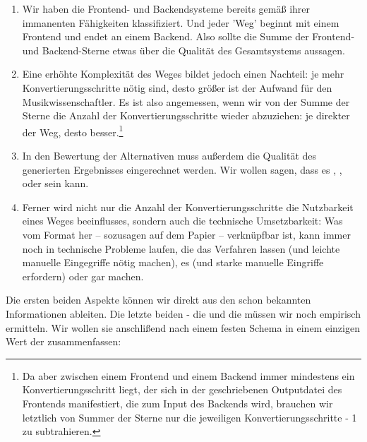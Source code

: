 \begin{enumerate}
  \item Wir haben die Frontend- und Backendsysteme bereits gemäß ihrer immanenten
  Fähigkeiten klassifiziert. Und jeder 'Weg' beginnt mit einem Frontend und endet
  an einem Backend. Also sollte die Summe der Frontend- und Backend-Sterne etwas
  über die Qualität des Gesamtsystems aussagen.
  \item Eine erhöhte Komplexität des Weges bildet jedoch einen Nachteil: je mehr
  Konvertierungsschritte nötig sind, desto größer ist der Aufwand für den
  Musikwissenschaftler. Es ist also angemessen, wenn wir von der Summe der
  Sterne die Anzahl der Konvertierungsschritte wieder abzuziehen: je direkter
  der Weg, desto besser.\footnote{Da aber zwischen einem Frontend und einem
  Backend immer mindestens ein Konvertierungsschritt liegt, der sich in der
  geschriebenen Outputdatei des Frontends manifestiert, die zum Input des
  Backends wird, brauchen wir letztlich von Summer der Sterne nur die jeweiligen
  Konvertierungsschritte - 1 zu subtrahieren.}
  \item In den Bewertung der Alternativen muss außerdem die Qualität des
  generierten Ergebnisses eingerechnet werden. Wir wollen sagen, dass es
  , ,  oder 
  sein kann.
  \item Ferner wird nicht nur die Anzahl der Konvertierungsschritte die
  Nutzbarkeit eines Weges beeinflusses, sondern auch die technische
  Umsetzbarkeit: Was vom Format her -- sozusagen auf dem Papier --
   verknüpfbar ist, kann immer noch in technische Probleme
  laufen, die das Verfahren  lassen (und leichte manuelle
  Eingegriffe nötig machen), es  (und starke manuelle Eingriffe
  erfordern) oder gar  machen.
\end{enumerate}
 
Die ersten beiden Aspekte können wir direkt aus den schon bekannten
Informationen ableiten. Die letzte beiden - die 
und die  müssen wir noch empirisch ermitteln. Wir
wollen sie anschlißend nach einem festen Schema in einem einzigen Wert der
 zusammenfassen:


